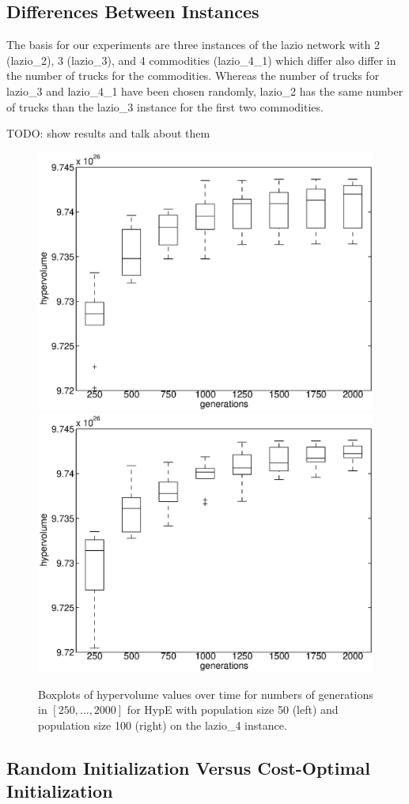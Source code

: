 \documentclass[preprint,12pt]{elsarticle}
\newcommand{\TODO}[1]{{\color{red}TODO: #1}}
\begin{document}
\subsection{Differences Between Instances}
The basis for our experiments are three instances of the lazio network with 2 (lazio\_2), 3 (lazio\_3), and 4 commodities (lazio\_4\_1) which differ also differ in the number of trucks for the commodities. Whereas the number of trucks for lazio\_3 and lazio\_4\_1 have been chosen randomly, lazio\_2 has the same number of trucks than the lazio\_3 instance for the first two commodities.

\TODO{show results and talk about them}



\begin{figure}%
	\centering
	\includegraphics[width=0.48\columnwidth]{../experiments/randVsCost/hypervolumes/hypervolumeOverTime_50.eps}%
	\includegraphics[width=0.48\columnwidth]{../experiments/randVsCost/hypervolumes/hypervolumeOverTime_100.eps}%
	\caption{\label{fig:hypervolumeOverTime} Boxplots of hypervolume values over time for numbers of generations in $[250, \ldots, 2000]$ for HypE with population size 50 (left) and population size 100 (right) on the lazio\_4 instance.}
\end{figure}


\subsection{Random Initialization Versus Cost-Optimal Initialization}
\end{document}
